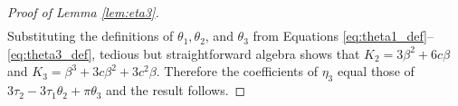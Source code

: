 \begin{proof}[Proof of Lemma \ref{lem:eta3}]
\begin{align*}
\end{align*}
Substituting the definitions of $\theta_1, \theta_2$, and $\theta_3$ from Equations \ref{eq:theta1_def}--\ref{eq:theta3_def}, tedious but straightforward algebra shows that $K_2 = 3\beta^2 + 6c\beta$ and $K_3 = \beta^3 + 3c\beta^2 + 3c^2\beta$.
Therefore the coefficients of $\eta_3$ equal those of $3\tau_2 - 3\tau_1 \theta_2 + \pi \theta_3$ and the result follows.
\end{proof}

